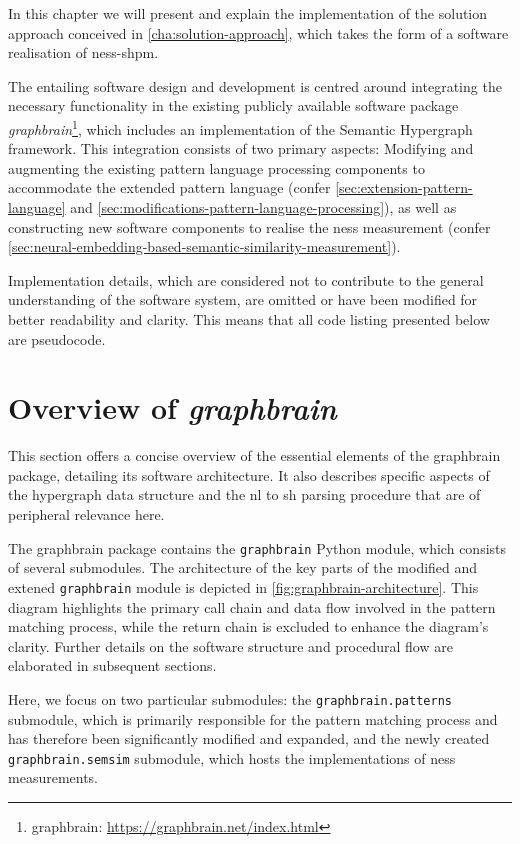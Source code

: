 \documentclass[11pt]{scrreprt}
\begin{document}
In this chapter we will present and explain the implementation of the solution approach conceived in \cref{cha:solution-approach}, which takes the form of a software realisation of \gls{ness-shpm}.

The entailing software design and development is centred around integrating the necessary functionality in the existing publicly available software package \textit{graphbrain}\footnote{graphbrain: \url{https://graphbrain.net/index.html}}, which includes an implementation of the Semantic Hypergraph framework. This integration consists of two primary aspects: Modifying and augmenting the existing pattern language processing components to accommodate the extended pattern language (confer \cref{sec:extension-pattern-language} and \cref{sec:modifications-pattern-language-processing}), as well as constructing new software components to realise the \gls{ness} measurement (confer \cref{sec:neural-embedding-based-semantic-similarity-measurement}).

Implementation details, which are considered not to contribute to the general understanding of the software system, are omitted or  have been modified for better readability and clarity. This means that all code listing presented below are pseudocode.



\section{Overview of \textit{graphbrain}}
This section offers a concise overview of the essential elements of the graphbrain package, detailing its software architecture. It also describes specific aspects of the hypergraph data structure and the \gls{nl} to \gls{sh} parsing procedure that are of peripheral relevance here.

The graphbrain package contains the \texttt{graphbrain} Python module, which consists of several submodules. The architecture of the key parts of the modified and extened \texttt{graphbrain} module is depicted in \cref{fig:graphbrain-architecture}. This diagram highlights the primary call chain and data flow involved in the pattern matching process, while the return chain is excluded to enhance the diagram's clarity. Further details on the software structure and procedural flow are elaborated in subsequent sections.

Here, we focus on two particular submodules: the \texttt{graphbrain.patterns} submodule, which is primarily responsible for the pattern matching process and has therefore been significantly modified and expanded, and the newly created \texttt{graphbrain.semsim} submodule, which hosts the implementations of \gls{ness} measurements. 
\end{document}
